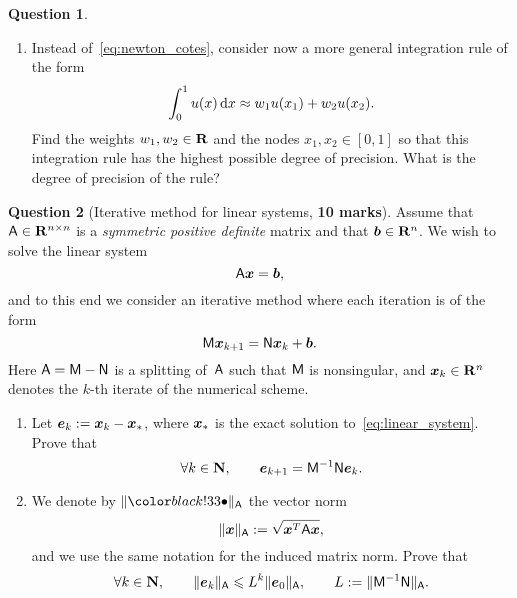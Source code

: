 \documentclass[11pt]{article}
\theoremstyle{definition}
\newtheorem{question}{Question}
\theoremstyle{remark}
\theoremstyle{plain}%
\begin{document}
\begin{question}
\begin{enumerate}
        \item
        Instead of~\eqref{eq:newton_cotes},
        consider now a more general integration rule of the form
        \begin{equation}
            \label{eq:gauss_legendre}
            \int_{0}^{1} u(x) \, \mathrm d x \approx w_1 u(x_1) + w_2 u(x_2).
        \end{equation}
        Find the weights $w_1, w_2 \in \mathbf R$ and the nodes $x_1, x_2 \in [0, 1]$ so that this integration rule has the highest possible degree of precision.
        What is the degree of precision of the rule?

    \end{enumerate}
\end{question}

\newpage
\begin{question}
    [Iterative method for linear systems, \textbf{10 marks}]
    Assume that $\mathsf A \in \mathbf R^{n \times n}$ is a \emph{symmetric positive definite} matrix and that $\mathbf{\boldsymbol{b}} \in \mathbf R^n$.
    We wish to solve the linear system
    \begin{equation}
        \label{eq:linear_system}
        \mathsf A \mathbf{\boldsymbol{x}} = \mathbf{\boldsymbol{b}},
    \end{equation}
    and to this end we consider an iterative method where each iteration is of the form
    \begin{equation}
        \label{eq:iterative_scheme}
        \mathsf M \mathbf{\boldsymbol{x}}_{k+1} = \mathsf N \mathbf{\boldsymbol{x}}_k + \mathbf{\boldsymbol{b}}.
    \end{equation}
    Here $\mathsf A = \mathsf M - \mathsf N$ is a splitting of~$\mathsf A$ such that $\mathsf M$ is nonsingular,
    and $\mathbf{\boldsymbol{x}}_k \in \mathbf R^n$ denotes the $k$-th iterate of the numerical scheme.

    \begin{enumerate}
        \item
            Let $\mathbf{\boldsymbol{e}}_k := \mathbf{\boldsymbol{x}}_k - \mathbf{\boldsymbol{x}}_*$,
            where $\mathbf{\boldsymbol{x}}_*$ is the exact solution to~\eqref{eq:linear_system}.
            Prove that
            \[
                \forall k \in \mathbf N, \qquad
                \mathbf{\boldsymbol{e}}_{k+1} = \mathsf M^{-1} \mathsf N \mathbf{\boldsymbol{e}}_k.
            \]

        \item
            We denote by $\norm{\placeholder}_{\mat A}$ the vector norm
            \begin{equation}
                \lVert\mathbf{\boldsymbol{x}}\rVert_{\mathsf A} := \sqrt{\mathbf{\boldsymbol{x}}^T \mathsf A \mathbf{\boldsymbol{x}}},
            \end{equation}
            and we use the same notation for the induced matrix norm.
            Prove that
            \begin{equation}
                \label{eq:inequality_interpolation}
                \forall k \in \mathbf N, \qquad
                \lVert\mathbf{\boldsymbol{e}}_k\rVert_{\mathsf A} \leqslant L^k \lVert\mathbf{\boldsymbol{e}}_0\rVert_{\mathsf A},
                \qquad L := \lVert\mathsf M^{-1} \mathsf N\rVert_{\mathsf A}.
            \end{equation}


\end{enumerate}
\end{question}
\end{document}
